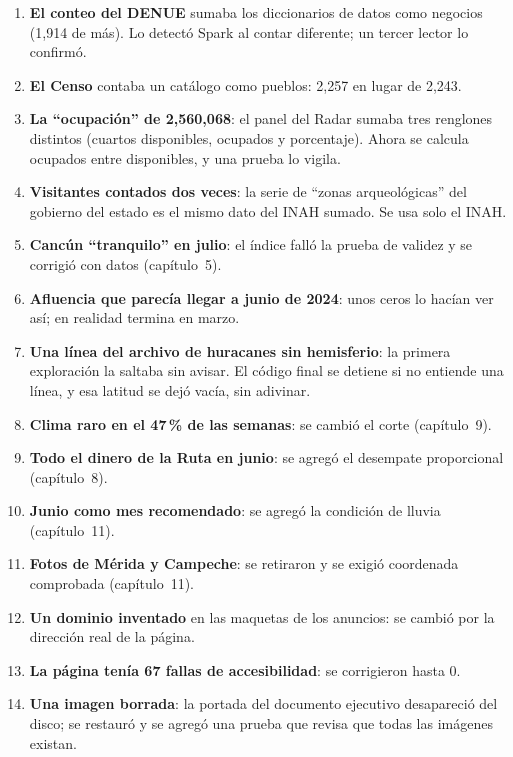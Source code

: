 \begin{enumerate}
\item \textbf{El conteo del DENUE} sumaba los diccionarios de datos como negocios (1,914 de más). Lo detectó Spark al
  contar diferente; un tercer lector lo confirmó.
\item \textbf{El Censo} contaba un catálogo como pueblos: 2,257 en lugar de 2,243.
\item \textbf{La ``ocupación'' de 2,560,068}: el panel del Radar sumaba tres renglones distintos (cuartos disponibles,
  ocupados y porcentaje). Ahora se calcula ocupados entre disponibles, y una prueba lo vigila.
\item \textbf{Visitantes contados dos veces}: la serie de ``zonas arqueológicas'' del gobierno del estado es el mismo dato
  del INAH sumado. Se usa solo el INAH.
\item \textbf{Cancún ``tranquilo'' en julio}: el índice falló la prueba de validez y se corrigió con datos (capítulo~5).
\item \textbf{Afluencia que parecía llegar a junio de 2024}: unos ceros lo hacían ver así; en realidad termina en marzo.
\item \textbf{Una línea del archivo de huracanes sin hemisferio}: la primera exploración la saltaba sin avisar. El código
  final se detiene si no entiende una línea, y esa latitud se dejó vacía, sin adivinar.
\item \textbf{Clima raro en el 47\,\% de las semanas}: se cambió el corte (capítulo~9).
\item \textbf{Todo el dinero de la Ruta en junio}: se agregó el desempate proporcional (capítulo~8).
\item \textbf{Junio como mes recomendado}: se agregó la condición de lluvia (capítulo~11).
\item \textbf{Fotos de Mérida y Campeche}: se retiraron y se exigió coordenada comprobada (capítulo~11).
\item \textbf{Un dominio inventado} en las maquetas de los anuncios: se cambió por la dirección real de la página.
\item \textbf{La página tenía 67 fallas de accesibilidad}: se corrigieron hasta 0.
\item \textbf{Una imagen borrada}: la portada del documento ejecutivo desapareció del disco; se restauró y se agregó una
  prueba que revisa que todas las imágenes existan.
\end{enumerate}
